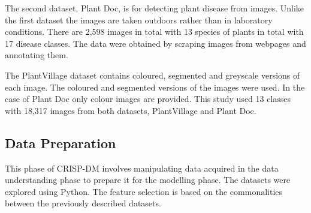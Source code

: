 \documentclass[conference]{IEEEtran}
\begin{document}
The second dataset, Plant Doc\cite{kaggledatasetPlantDoc}, is for detecting plant disease from images. Unlike the first dataset the images are taken outdoors rather than in laboratory conditions. There are 2,598 images in total with 13 species of plants in total with 17 disease classes. The data were obtained by scraping images from webpages and annotating them. 

The PlantVillage dataset contains coloured, segmented and greyscale versions of each image. The coloured and segmented versions of the images were used. In the case of Plant Doc only colour images are provided. This study used 13 classes with 18,317 images from both datasets, PlantVillage and Plant Doc.  
\subsection{Data Preparation}
This phase of CRISP-DM involves manipulating data acquired in the data understanding phase to prepare it for the modelling phase. The datasets were explored using Python. The feature selection is based on the commonalities between the previously described datasets. \
\end{document}
